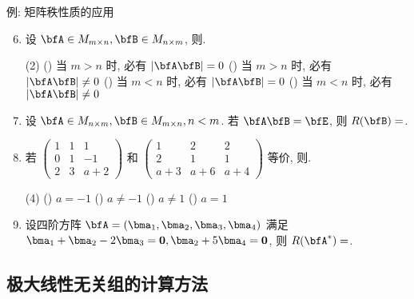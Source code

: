 \begin{frame}{例: 矩阵秩性质的应用}
	\begin{exercise}
		\begin{enumerate}
			\setcounter{enumi}{5}
			\item 设 $\bfA\in M_{m\times n},\bfB\in M_{n\times m}$, 则.
			\begin{taskschoice}(2)
				() 当 $m>n$ 时, 必有 $|\bfA\bfB|=0$
				() 当 $m>n$ 时, 必有 $|\bfA\bfB|\neq0$
				() 当 $m<n$ 时, 必有 $|\bfA\bfB|=0$
				() 当 $m<n$ 时, 必有 $|\bfA\bfB|\neq0$
			\end{taskschoice}
			\item 设 $\bfA\in M_{n\times m},\bfB\in M_{m\times n},n<m$. 若 $\bfA\bfB=\bfE$, 则 $R(\bfB)=$.
			\item 若 $\begin{pmatrix}
				1&1&1\\0&1&-1\\2&3&a+2
			\end{pmatrix}$ 和 $\begin{pmatrix}
				1&2&2\\2&1&1\\a+3&a+6&a+4
			\end{pmatrix}$ 等价, 则.
			\begin{taskschoice}(4)
				() $a=-1$
				() $a\neq-1$
				() $a\neq 1$
				() $a=1$
			\end{taskschoice}
			\item 设四阶方阵 $\bfA=(\bma_1,\bma_2,\bma_3,\bma_4)$ 满足 $\bma_1+\bma_2-2\bma_3={\bf0},\bma_2+5\bma_4={\bf0}$, 则 $R(\bfA^*)=$.
		\end{enumerate}
	\end{exercise}
\end{frame}


\subsection{极大线性无关组的计算方法}

